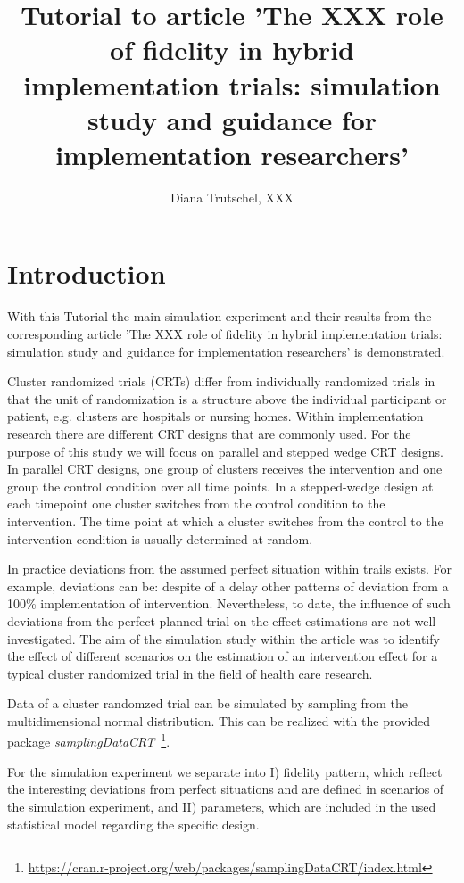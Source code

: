 \documentclass{article}\usepackage[]{graphicx}\usepackage[]{color}
\title{Tutorial to article 'The XXX role of fidelity in hybrid implementation trials: simulation study and guidance for implementation researchers'}
\author{Diana Trutschel, XXX}
\date{}
\newcommand{\Rpackage}[1]{{\textit{#1}}}
\begin{document}
\maketitle

\section{Introduction}
With this Tutorial the main simulation experiment and their results from the corresponding article 'The XXX role of fidelity in hybrid implementation trials: simulation study and guidance for implementation researchers' is demonstrated. 

Cluster randomized trials (CRTs) differ from individually randomized trials in that the unit of randomization is a structure above the individual participant or patient, e.g. clusters are hospitals or nursing homes.
Within implementation research there are different CRT designs that are commonly used. For the purpose of this study we will focus on parallel and stepped wedge CRT designs. 
In parallel CRT designs, one group of clusters receives the intervention and one group the control condition over all time points. In a stepped-wedge design at each timepoint one cluster switches from the control condition to the intervention. The time point at which a cluster switches from the control to the intervention condition is usually determined at random. 


In practice deviations from the assumed perfect situation within trails exists. 
For example, deviations can be: despite of a delay other patterns of deviation from a 100\% implementation of intervention. 
Nevertheless, to date, the influence of such deviations from the perfect planned trial on the effect estimations  are not well investigated.
The aim of the simulation study within the article was to identify the effect of different scenarios on the estimation of an intervention effect for a typical cluster randomized trial in the field of health care research.


Data of a cluster randomzed trial can be simulated by sampling from the multidimensional normal distribution. This can be realized with the provided package \Rpackage{samplingDataCRT}~\footnote{\url{https://cran.r-project.org/web/packages/samplingDataCRT/index.html}}. 


For the simulation experiment we separate into I) fidelity pattern, which reflect the interesting deviations from perfect situations and are defined in scenarios of the simulation experiment, and II) parameters, which are included in the used statistical model regarding the specific design.
\end{document}
